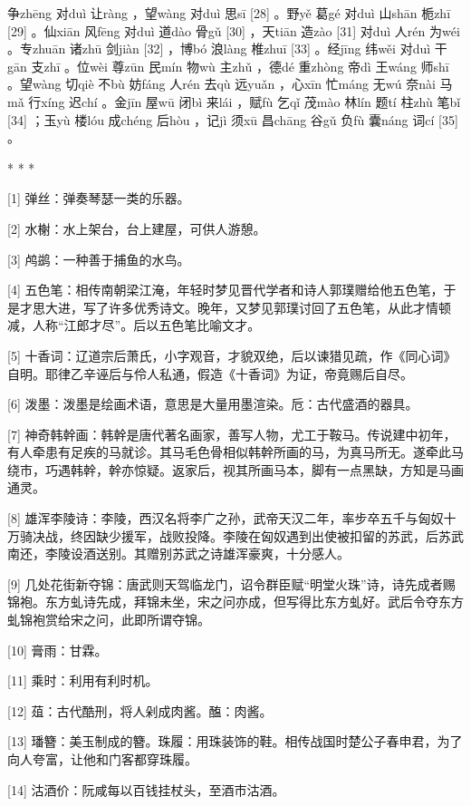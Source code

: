 \documentclass[12pt,UTF8]{ctexbook}
\begin{document}
争zhēng 对duì 让ràng ，望wàng 对duì 思sī [28] 。野yě 葛gé 对duì 山shān 栀zhī [29] 。仙xiān 风fēng 对duì 道dào 骨gǔ [30] ，天tiān 造zào [31] 对duì 人rén 为wéi 。专zhuān 诸zhū 剑jiàn [32] ，博bó 浪làng 椎zhuī [33] 。经jīng 纬wěi 对duì 干gān 支zhī 。位wèi 尊zūn 民mín 物wù 主zhǔ ，德dé 重zhòng 帝dì 王wáng 师shī 。望wàng 切qiè 不bù 妨fáng 人rén 去qù 远yuǎn ，心xīn 忙máng 无wú 奈nài 马mǎ 行xíng 迟chí 。金jīn 屋wū 闭bì 来lái ，赋fù 乞qǐ 茂mào 林lín 题tí 柱zhù 笔bǐ [34] ；玉yù 楼lóu 成chéng 后hòu ，记jì 须xū 昌chāng 谷gǔ 负fù 囊náng 词cí [35] 。



* * *



[1] 弹丝：弹奏琴瑟一类的乐器。

[2] 水榭：水上架台，台上建屋，可供人游憩。

[3] 鸬鹚：一种善于捕鱼的水鸟。

[4] 五色笔：相传南朝梁江淹，年轻时梦见晋代学者和诗人郭璞赠给他五色笔，于是才思大进，写了许多优秀诗文。晚年，又梦见郭璞讨回了五色笔，从此才情顿减，人称“江郎才尽”。后以五色笔比喻文才。

[5] 十香词：辽道宗后萧氏，小字观音，才貌双绝，后以谏猎见疏，作《同心词》自明。耶律乙辛诬后与伶人私通，假造《十香词》为证，帝竟赐后自尽。

[6] 泼墨：泼墨是绘画术语，意思是大量用墨渲染。卮：古代盛酒的器具。

[7] 神奇韩幹画：韩幹是唐代著名画家，善写人物，尤工于鞍马。传说建中初年，有人牵患有足疾的马就诊。其马毛色骨相似韩幹所画的马，为真马所无。遂牵此马绕市，巧遇韩幹，幹亦惊疑。返家后，视其所画马本，脚有一点黑缺，方知是马画通灵。

[8] 雄浑李陵诗：李陵，西汉名将李广之孙，武帝天汉二年，率步卒五千与匈奴十万骑决战，终因缺少援军，战败投降。李陵在匈奴遇到出使被扣留的苏武，后苏武南还，李陵设酒送别。其赠别苏武之诗雄浑豪爽，十分感人。

[9] 几处花街新夺锦：唐武则天驾临龙门，诏令群臣赋“明堂火珠”诗，诗先成者赐锦袍。东方虬诗先成，拜锦未坐，宋之问亦成，但写得比东方虬好。武后令夺东方虬锦袍赏给宋之问，此即所谓夺锦。

[10] 膏雨：甘霖。

[11] 乘时：利用有利时机。

[12] 葅：古代酷刑，将人剁成肉酱。醢：肉酱。

[13] 璠簪：美玉制成的簪。珠履：用珠装饰的鞋。相传战国时楚公子春申君，为了向人夸富，让他和门客都穿珠履。

[14] 沽酒价：阮咸每以百钱挂杖头，至酒市沽酒。
\end{document}
